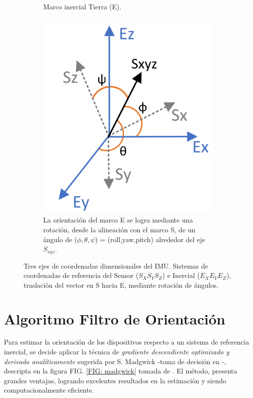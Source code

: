 \begin{figure}[H]
\begin{subfigure}[b]{0.5\textwidth}
  \caption{ Marco inercial Tierra (E). }
  \label{fig:sfig2}
\end{subfigure}
\begin{subfigure}[b]{0.5\textwidth}
  \centering
  \includegraphics[width=\textwidth]{TESIS/imagenes/chap05/frame-translation.PNG}
  \caption{La orientación del marco E se logra mediante una rotación, desde la alineación con el marco S, de un ángulo de ($\phi,\theta ,\psi$) = (roll,yaw,pitch) alrededor del eje $S_{xyz}$.}
  \label{fig:sfig2}
\end{subfigure}
\caption{Tres ejes de coordenadas dimensionales del IMU. Sistemas de coordenadas de referencia del Sensor ($S_XS_YS_Z$) e Inercial ($E_XE_YE_Z$), traslación del vector en S hacia E, mediante rotación de ángulos. }
\label{fig:sensor-frame}
\end{figure}

\section{Algoritmo Filtro de Orientación} \label{impl:orientation-filter}

Para estimar la orientación de los dispositivos respecto a un sistema de referencia inercial, se decide aplicar la técnica de \textit{gradiente descendiente optimizado y derivado analíticamente} sugerida por S. Madgwick -toma de decisión en -, descripta en la figura FIG. \ref{FIG: madgwick} tomada de \cite{Madgwick}. El método, presenta grandes ventajas, logrando excelentes resultados en la estimación y siendo computacionalmente eficiente.

